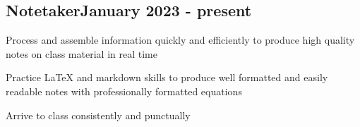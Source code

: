 \documentclass[a4paper,12pt]{article}
\begin{document}


\vspace*{10pt}
\subsection{{Notetaker}\hfill January 2023 - present}
\begin{zitemize}
\item Process and assemble information quickly and efficiently to produce high quality notes on class material in real time
\item Practice \LaTeX{} and markdown skills to produce well formatted and easily readable notes with professionally formatted equations
\item Arrive to class consistently and punctually
\end{zitemize}

% 
\end{document}
